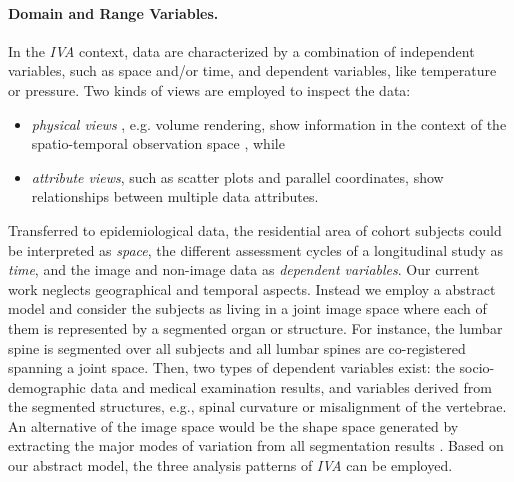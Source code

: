 \documentclass[journal]{style/vgtc} 			          %
\begin{document}
\paragraph{Domain and Range Variables. }
In the \emph{IVA} context, data are characterized by a combination of independent variables, such as space and/or time, and dependent variables, like temperature or pressure.
%
Two kinds of views are employed to inspect the data:
\begin{itemize} \itemsep0.2em
	\item \emph{physical views} \cite{Oeltze2013}, e.g. volume rendering, show information in the context of the spatio-temporal observation space \cite{Oeltze2007}, while
	\item \emph{attribute views}, such as scatter plots and parallel coordinates, show relationships between multiple data attributes.
\end{itemize}
Transferred to epidemiological data, the residential area of cohort subjects could be interpreted as \emph{space}, the different assessment cycles of a longitudinal study as \emph{time}, and the image and non-image data as \emph{dependent variables}.
%
Our current work neglects geographical and temporal aspects.
%
Instead we employ a abstract model and consider the subjects as living in a joint image space where each of them is represented by a segmented organ or structure.
%
For instance, the lumbar spine is segmented over all subjects and all lumbar spines are co-registered spanning a joint space.
%
Then, two types of dependent variables exist: the socio-demographic data and medical examination results, and variables derived from the segmented structures, e.g., spinal curvature or misalignment of the vertebrae.
An alternative of the image space would be the shape space generated by extracting the major modes of variation from all segmentation results \cite{Busking2010a}.
%
Based on our abstract model, the three analysis patterns of \emph{IVA} can be employed.
\end{document}
